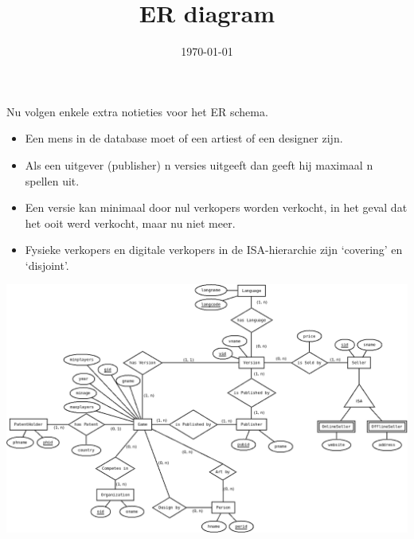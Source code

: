 \documentclass[a4paper, dutch, parskip=full]{scrartcl}
\begin{document}
\title{ER diagram}
\author{}
\date{\today}
\maketitle
Nu volgen enkele extra notieties voor het ER schema.
\begin{itemize}
  \item Een mens in de database moet of een artiest of een designer zijn.
  \item Als een uitgever (publisher) n versies uitgeeft dan geeft hij maximaal n spellen uit.
  \item Een versie kan minimaal door nul verkopers worden verkocht, in het geval dat het ooit werd verkocht, maar nu niet meer.
  \item Fysieke verkopers en digitale verkopers in de ISA-hierarchie zijn `covering' en `disjoint'.
\end{itemize}

\includegraphics[scale=0.33]{ER}
\end{document}
